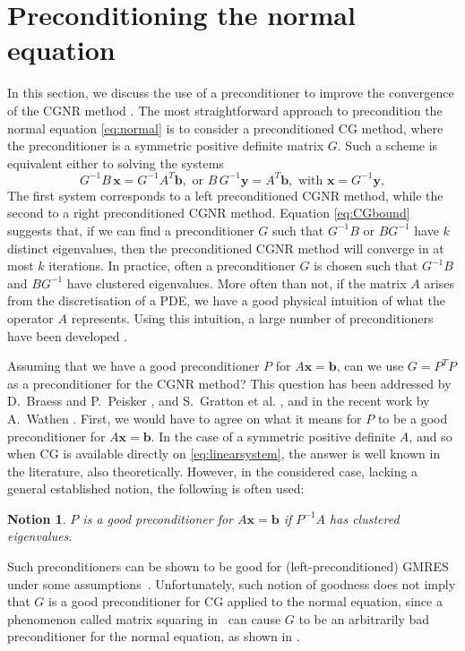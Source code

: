 \documentclass[hidelinks,onefignum,onetabnum]{siamart220329}
\newtheorem{nt}{Notion}
\let\vec\mathbf
\begin{document}
\section{Preconditioning the normal equation}
\label{sec:precond}
In this section, we discuss the use of a preconditioner to improve the convergence of the CGNR method \cite{WathenNormal}.
The most straightforward approach to precondition the normal equation \eqref{eq:normal} is to consider a preconditioned CG method, where the preconditioner is a symmetric positive definite matrix ${G}$.
Such a scheme is equivalent either to solving the systems
\begin{equation}
    \label{eq:normalPrecond}
    {G}^{-1}{B}\,\vec{x} = {G}^{-1}{A}^T\vec{b},\text{ or } {B}\,{G}^{-1}\vec{y} = {A}^T\vec{b}, \text{ with } \vec{x} = {G}^{-1}\vec{y},
\end{equation}
The first system corresponds to a left preconditioned CGNR method, while the second to a right preconditioned CGNR method.
Equation \eqref{eq:CGbound} suggests that, if we can find a preconditioner ${G}$ such that ${G}^{-1}{B}$ or ${B}{G}^{-1}$ have $k$ distinct eigenvalues, then the preconditioned CGNR method will converge in at most $k$ iterations.
In practice, often a preconditioner $G$ is chosen such that ${G}^{-1}{B}$ and ${B}{G}^{-1}$ have clustered eigenvalues.
More often than not, if the matrix ${A}$ arises from the discretisation of a PDE, we have a good physical intuition of what the operator ${A}$ represents.
Using this intuition, a large number of preconditioners have been developed \cite{Elman,Wathen,Benzi,Farrell}.

Assuming that we have a good preconditioner ${P}$ for $A\vec{x} = \vec{b}$, can we use ${G} = {P}^T{P}$ as a preconditioner for the CGNR method?
This question has been addressed by D.~Braess and P.~Peisker \cite{Braess}, and S.~Gratton et al. \cite{Gratton}, and in the recent work by A.~Wathen \cite{WathenNormal}.
First, we would have to agree on what it means for ${P}$ to be a good preconditioner for $A\vec{x} = \vec{b}$. In the case of a symmetric positive definite $A$, and so when CG is available directly on \eqref{eq:linearsystem}, the answer is well known in the literature, also theoretically. However, in the considered case, lacking a general established notion, the following is often used:
\begin{nt}
    \label{nt:classical}
    $P$ is a good preconditioner for  $A\vec{x} = \vec{b}$ if ${P}^{-1}{A}$ has clustered eigenvalues.
\end{nt}
Such preconditioners can be shown to be good for (left-preconditioned) GMRES under some assumptions~\cite{Saad}.
Unfortunately, such notion of goodness does not imply that $G$ is a good preconditioner for CG applied to the normal equation, since a phenomenon called matrix squaring in~\cite{WathenNormal} can cause $G$ to be an arbitrarily bad preconditioner for the normal equation, as shown in \cite{Wathen}.
\end{document}
